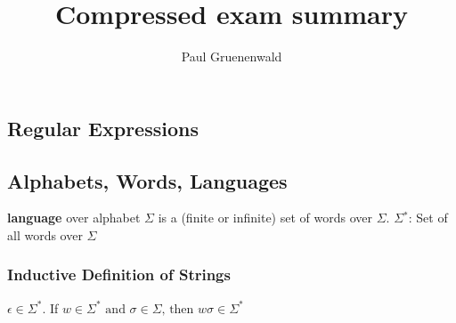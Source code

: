 \documentclass[a3paper, 8pt]{extarticle}
\title{Compressed exam summary}
\author{Paul Gruenenwald}
\begin{document}



\setlength{\abovedisplayskip}{6pt}
\setlength{\belowdisplayskip}{6pt}
\setlength{\abovedisplayshortskip}{5pt}
\setlength{\belowdisplayshortskip}{5pt}


\RaggedRight

\begin{multicols*}{6}
       
\section{ Regular Expressions}
\subsection{Alphabets, Words, Languages}

        \textbf{language} over alphabet $\Sigma$ is a (finite or infinite) set of words over $\Sigma$. $\Sigma{^*}$: Set of all words over $\Sigma$
\subsubsection{Inductive Definition of Strings}
        $\epsilon \in \Sigma^*$. If $w \in \Sigma^* \text{ and } \sigma \in \Sigma \text{, then } w\sigma \in \Sigma^*$


\end{multicols*}
\end{document}
